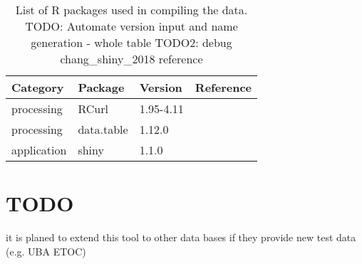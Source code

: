 \begin{table}[h!]
    \centering
    \begin{tabular}{|l|l|l|l|}
        \hline
        Category        & Package       & Version   & Reference                     \\ \hline
        processing      & RCurl         & 1.95-4.11 & \citep{lang_rcurl_2018}       \\ \hline
        processing      & data.table    & 1.12.0    & \citep{dowle_data.table_2018} \\ \hline
        application     & shiny         & 1.1.0     & \citep{chang_shiny_2018}      \\ \hline
    \end{tabular}
    \caption{List of R packages used in compiling the data.\newline{}
    TODO: Automate version input and name generation - whole table\newline{}
    TODO2: debug chang\_shiny\_2018 reference}
    \label{tab:rpackages}
\end{table}


\section{TODO}

    \item it is planed to extend this tool to other data bases if they provide new test data  (e.g. UBA ETOC)